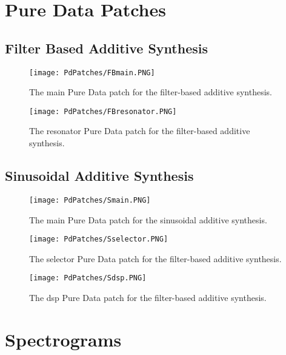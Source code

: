 \chapter{Pure Data Patches}\label{ap:pd_patches}

\section{Filter Based Additive Synthesis}
\begin{figure}[H]
  \centering
    \texttt{[image: PdPatches/FBmain.PNG]}
      \caption{The main Pure Data patch for the filter-based additive synthesis.}
      \label{fig:FBmain}
\end{figure}

\begin{figure}[H]
  \centering
    \texttt{[image: PdPatches/FBresonator.PNG]}
      \caption{The resonator Pure Data patch for the filter-based additive synthesis.}
      \label{fig:FBres}
\end{figure}

\section{Sinusoidal Additive Synthesis}

\begin{figure}[H]
  \centering
    \texttt{[image: PdPatches/Smain.PNG]}
      \caption{The main Pure Data patch for the sinusoidal additive synthesis.}
      \label{fig:Smain}
\end{figure}

\begin{figure}[H]
  \centering
    \texttt{[image: PdPatches/Sselector.PNG]}
      \caption{The selector Pure Data patch for the filter-based additive synthesis.}
      \label{fig:Ssel}
\end{figure}

\begin{figure}[H]
  \centering
    \texttt{[image: PdPatches/Sdsp.PNG]}
      \caption{The dsp Pure Data patch for the filter-based additive synthesis.}
      \label{fig:Sdsp}
\end{figure}

\chapter{Spectrograms}\label{ap:spectrograms}
